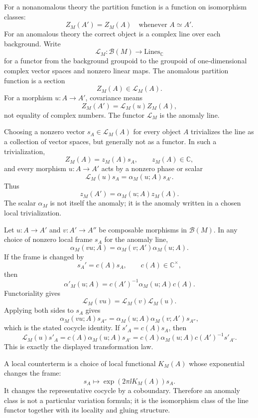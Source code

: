 For a nonanomalous theory the partition function is a function on isomorphism
classes:
\[
  Z_M(A')=Z_M(A)
  \quad\text{whenever }A\simeq A'.
\]
For an anomalous theory the correct object is a complex line over each
background.  Write
\[
  \mathcal L_M:\mathcal B(M)\longrightarrow
  \mathrm{Lines}_{\mathbb C}
\]
for a functor from the background groupoid to the groupoid of one-dimensional
complex vector spaces and nonzero linear maps.  The anomalous partition
function is a section
\[
  Z_M(A)\in \mathcal L_M(A).
\]
For a morphism \(u:A\to A'\), covariance means
\[
  Z_M(A')=\mathcal L_M(u)Z_M(A),
\]
not equality of complex numbers.  The functor \(\mathcal L_M\) is the anomaly
line.

Choosing a nonzero vector \(s_A\in\mathcal L_M(A)\) for every object \(A\)
trivializes the line as a collection of vector spaces, but generally not as a
functor.  In such a trivialization,
\[
  Z_M(A)=z_M(A)s_A,\qquad z_M(A)\in\mathbb C,
\]
and every morphism \(u:A\to A'\) acts by a nonzero phase or scalar
\[
  \mathcal L_M(u)s_A=\alpha_M(u;A)s_{A'}.
\]
Thus
\[
  z_M(A')=\alpha_M(u;A)z_M(A).
\]
The scalar \(\alpha_M\) is not itself the anomaly; it is the anomaly written
in a chosen local trivialization.

\begin{remark}
\label{rem:anomaly-line-functorial-cocycle}
Let \(u:A\to A'\) and \(v:A'\to A''\) be composable morphisms in
\(\mathcal B(M)\).  In any choice of nonzero local frame \(s_A\) for the
anomaly line,
\[
  \alpha_M(vu;A)
  =
  \alpha_M(v;A')\alpha_M(u;A).
\]
If the frame is changed by
\[
  s_A'=c(A)s_A,\qquad c(A)\in\mathbb C^\times,
\]
then
\[
  \alpha'_M(u;A)
  =
  c(A')^{-1}\alpha_M(u;A)c(A).
\]
Functoriality gives
\[
  \mathcal L_M(vu)
  =
  \mathcal L_M(v)\mathcal L_M(u).
\]
Applying both sides to \(s_A\) gives
\[
  \alpha_M(vu;A)s_{A''}
  =
  \alpha_M(u;A)\alpha_M(v;A')s_{A''},
\]
which is the stated cocycle identity.  If \(s'_A=c(A)s_A\), then
\[
  \mathcal L_M(u)s'_A
  =
  c(A)\alpha_M(u;A)s_{A'}
  =
  c(A)\alpha_M(u;A)c(A')^{-1}s'_{A'}.
\]
This is exactly the displayed transformation law.
\end{remark}

A local counterterm is a choice of local functional \(K_M(A)\) whose
exponential changes the frame:
\[
  s_A\longmapsto
  \exp(2\pi\ii K_M(A))s_A.
\]
It changes the representative cocycle by a coboundary.  Therefore an anomaly
class is not a particular variation formula; it is the isomorphism class of
the line functor together with its locality and gluing structure.

